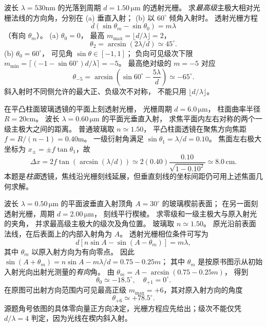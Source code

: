 波长 $\lambda=530$nm 的光落到周期
$d=1.50\,\mathrm{\mu m}$ 的透射光栅。
求\emph{最高级}主极大相对光栅法线的方向角，分别在
(a) 垂直入射；
(b) 以 $60^\circ$ 倾角入射时。
\exsolution
透射光栅方程
\[
d(\sin\theta_m-\sin\theta_0)=m\lambda
\]
（有向 $\theta_m$）。
(a) $\theta_0=0$，
最高 $m_{\max}=\lfloor d/\lambda\rfloor=2$，
\[
\boxed{\theta_2=\arcsin(2\lambda/d)
\simeq45^\circ}.
\]
(b) $\theta_0=60^\circ$，
可见角 $\sin\theta\in[-1,1]$；
负向可见级次下限
$m_{\min}=\lceil(-1-\sin60^\circ)d/\lambda\rceil=-5$。
最高绝对级的 $m=-5$ 对应
\[
\boxed{\theta_{-5}=
\arcsin\left(\sin60^\circ-\frac{5\lambda}{d}\right)
\simeq-65^\circ}.
\]
\excheck 斜入射时不同侧允许的最大正、负级次不对称，
不能只用 $\lfloor d/\lambda\rfloor$。

在平凸柱面玻璃透镜的平面上刻透射光栅，
光栅周期 $d=6.0\,\mathrm{\mu m}$，
柱面曲率半径 $R=20$cm。
波长 $\lambda=0.60\,\mathrm{\mu m}$ 的平面光垂直入射，
求焦平面内左右对称的两个一级主极大之间的距离。
\exsolution
普通玻璃取 $n\simeq1.50$，
平凸柱面透镜在聚焦方向焦距
$f=R/(n-1)=0.40$m。
一级衍射角满足
$\sin\theta_1=\lambda/d=0.10$。
焦面左右极大坐标为
$x_\pm=\pm f\tan\theta_1$，故
\[
\boxed{\Delta x=2f\tan(\arcsin(\lambda/d))
\simeq2(0.40)\frac{0.10}{\sqrt{1-0.10^2}}
\simeq8.0\,\mathrm{cm}}.
\]
\excheck 本题是\emph{柱面}透镜，焦线沿光栅刻线延展，但垂直刻线的坐标间距仍可用上述焦面几何求解。

波长 $\lambda=0.50\,\mathrm{\mu m}$ 的平面波垂直入射顶角
$A=30^\circ$ 的玻璃楔前表面；
在另一面刻透射光栅，周期
$d=2.00\,\mathrm{\mu m}$，
刻线平行楔棱。
求零级和一级主极大与原入射光的夹角，
并求最高级主极大的级次及角位置。
\exsolution
玻璃取 $n\simeq1.50$。
原光沿前表面法线，在后表面上的内部入射角为 $A$。
透射光栅相位条件可写为
\[
d[n\sin A-\sin(A-\theta_m)]=m\lambda,
\]
其中 $\theta_m$ 以原入射方向为有向零点。
因此
$\sin(A+\theta_m)=n\sin A-m\lambda/d
=0.75-0.25m$；
其中 $\theta_m$ 是按原书图示从初始入射光向出射光测量的\emph{有向}角。
由
$\theta_m=A-\arcsin(0.75-0.25m)$，
得到
\[
\boxed{\theta_0\simeq-18.5^\circ},\quad
\boxed{\theta_{+1}=0^\circ}.
\]
在原图可出射方向范围内可见最高正级
$\boxed{m_{\max}=+6}$，其对原入射方向的角度
\[
\boxed{\theta_{+6}\simeq+78.5^\circ}.
\]
\excheck 源题角号依图的具体零向量正方向决定，光栅方程应先给出；级次不能仅凭 $d/\lambda=4$ 判定，因为光线在楔内斜入射。
